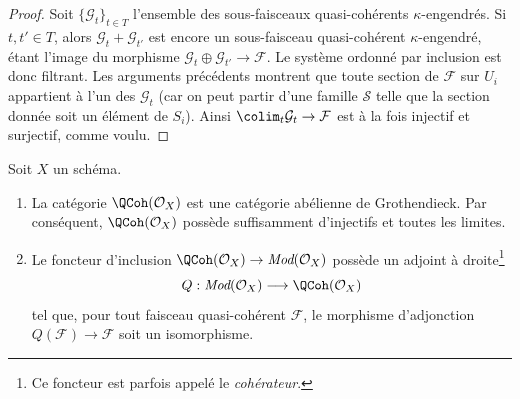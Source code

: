 \begin{proof}
\medskip\noindent
Soit $\{\mathcal{G}_t\}_{t \in T}$ l'ensemble des sous-faisceaux
quasi-cohérents $\kappa$-engendrés. Si $t, t' \in T$,
alors $\mathcal{G}_t + \mathcal{G}_{t'}$ est encore un sous-faisceau
quasi-cohérent $\kappa$-engendré, étant l'image du morphisme
$\mathcal{G}_t \oplus \mathcal{G}_{t'} \to \mathcal{F}$.
Le système ordonné par inclusion est donc filtrant.
Les arguments précédents montrent que toute section de $\mathcal{F}$ sur $U_i$
appartient à l'un des $\mathcal{G}_t$ (car on peut partir d'une famille $\mathcal{S}$
telle que la section donnée soit un élément de $S_i$). Ainsi
$\colim_t \mathcal{G}_t \to \mathcal{F}$ est à la fois injectif et surjectif,
comme voulu.
\end{proof}

\begin{proposition}
\label{proposition-coherator}
Soit $X$ un schéma.
\begin{enumerate}
\item La catégorie $\QCoh(\mathcal{O}_X)$ est une catégorie abélienne
de Grothendieck. Par conséquent, $\QCoh(\mathcal{O}_X)$
possède suffisamment d'injectifs et toutes les limites.
\item Le foncteur d'inclusion
$\QCoh(\mathcal{O}_X) \to \textit{Mod}(\mathcal{O}_X)$
possède un adjoint à droite\footnote{Ce foncteur est parfois appelé
le {\it cohérateur}.}
$$
Q : \textit{Mod}(\mathcal{O}_X) \longrightarrow \QCoh(\mathcal{O}_X)
$$
tel que, pour tout faisceau quasi-cohérent $\mathcal{F}$, le morphisme d'adjonction
$Q(\mathcal{F}) \to \mathcal{F}$ soit un isomorphisme.
\end{enumerate}
\end{proposition}

